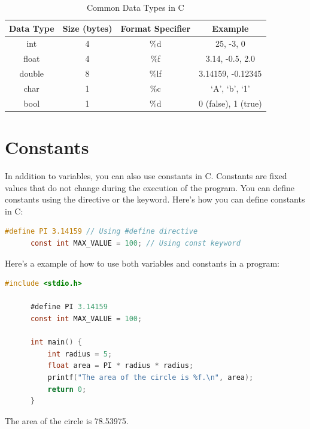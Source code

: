 \documentclass[12pt, openany]{book}
\begin{document}
  \begin{table}[h]
      \centering
      \begin{tabular}{|c|c|c|c|}
          \hline
          \textbf{Data Type} & \textbf{Size (bytes)} & \textbf{Format Specifier} & \textbf{Example} \\
          \hline
          int & 4 & \%d & 25, -3, 0 \\
          \hline
          float & 4 & \%f & 3.14, -0.5, 2.0 \\
          \hline
          double & 8 & \%lf & 3.14159, -0.12345 \\
          \hline
          char & 1 & \%c & `A', `b', `1' \\
          \hline
          bool & 1 & \%d & 0 (false), 1 (true) \\
          \hline
      \end{tabular}
      \caption{Common Data Types in C}
  \end{table}
  
  \section{Constants}
  In addition to variables, you can also use constants in C. Constants are fixed values that do not change during the execution of the program. You can define constants using the  directive or the  keyword. Here's how you can define constants in C:
  \begin{lstlisting}[language=C, caption=Defining Constants in C]
      #define PI 3.14159 // Using #define directive
      const int MAX_VALUE = 100; // Using const keyword
  \end{lstlisting}
  
  Here's a example of how to use both variables and constants in a program:
  \begin{lstlisting}[language=C, caption=Using Variables and Constants in C]
      #include <stdio.h>
      
      #define PI 3.14159
      const int MAX_VALUE = 100;
      
      int main() {
          int radius = 5;
          float area = PI * radius * radius;
          printf("The area of the circle is %f.\n", area);
          return 0;
      }
  \end{lstlisting}
  \begin{tcolorbox}[colback=lightgray!10, colframe=black, title=Output]
      The area of the circle is 78.53975.
  \end{tcolorbox}
  
\end{document}
